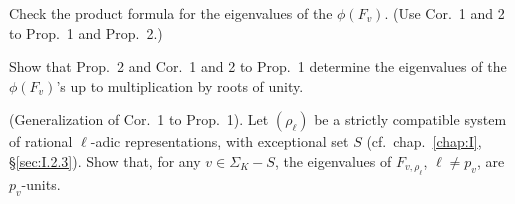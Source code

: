 
\begin{nlist}
\item Check the product formula for the eigenvalues of the
$\phi(F_v)$.  (Use Cor.~1 and 2 to Prop.~1 and Prop.~2.)

\item Show that Prop.~2 and Cor.~1 and 2 to Prop.~1 determine the
eigenvalues of the $\phi(F_v)$'s up to multiplication by roots of unity.

\item (Generalization of Cor.~1 to Prop.~1).  Let $(\rho_\ell)$ be a
strictly compatible system of rational $\ell$-adic representations, with
exceptional set $S$ (cf.~chap.~\ref{chap:I}, \S\ref{sec:I.2.3}).  Show
that, for any $v \in \Sigma_K - S$, the eigenvalues of
$F_{v,\rho_\ell}$, $\ell \neq p_v$, are $p_v$-units.
\end{nlist}
